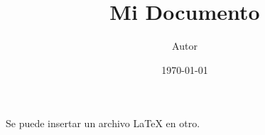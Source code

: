 \documentclass[12pt]{article}
\title{Mi Documento}
\author{Autor}
\date{\today}
\begin{document}
    Se puede insertar un archivo \LaTeX{} en otro.

    
\end{document}
